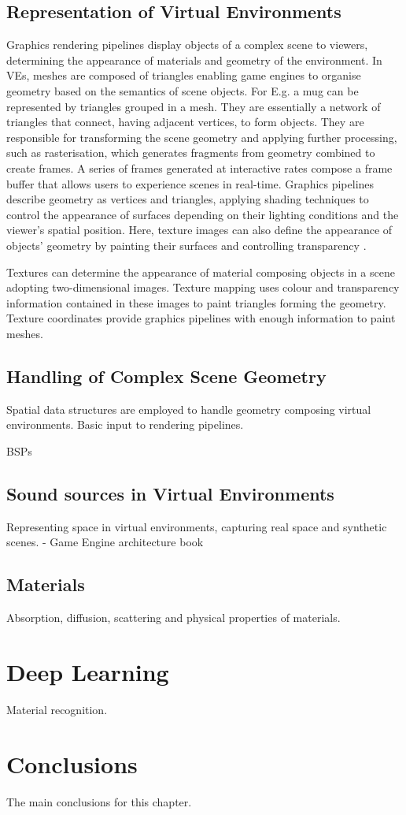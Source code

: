 \subsection{Representation of Virtual Environments}
Graphics rendering pipelines display objects of a complex scene to viewers, determining the appearance of materials and geometry of the environment. In VEs, meshes are composed of triangles enabling game engines to organise geometry based on the semantics of scene objects. For E.g. a mug can be represented by triangles grouped in a mesh. They are essentially a network of triangles that connect, having adjacent vertices, to form objects. They are responsible for transforming the scene geometry and applying further processing, such as rasterisation, which generates fragments from geometry combined to create frames. A series of frames generated at interactive rates compose a frame buffer that allows users to experience scenes in real-time. Graphics pipelines describe geometry as vertices and triangles, applying shading techniques to control the appearance of surfaces depending on their lighting conditions and the viewer’s spatial position. Here, texture images can also define the appearance of objects' geometry by painting their surfaces and controlling transparency \citep{mcallister2002efficient, marschner2015fundamentals}. \par
Textures can determine the appearance of material composing objects in a scene adopting two-dimensional images. Texture mapping uses colour and transparency information contained in these images to paint triangles forming the geometry. Texture coordinates provide graphics pipelines with enough information to paint meshes.

\subsection{Handling of Complex Scene Geometry}
\label{sec:bg-geometry-handling}
Spatial data structures are employed to handle geometry composing virtual environments. 
Basic input to rendering pipelines. 

BSPs


\subsection{Sound sources in Virtual Environments}


Representing space in virtual environments, capturing real space and synthetic scenes.
- Game Engine architecture book                             

\subsection{Materials}
Absorption, diffusion, scattering and physical properties of materials.


\section{Deep Learning}
Material recognition.



\section{Conclusions}

The main conclusions for this chapter.



